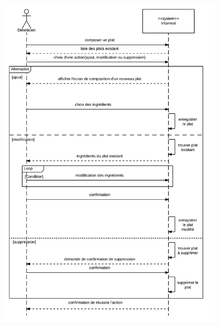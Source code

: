 \documentclass{beamer}
\begin{document}
\begin{frame}[plain]{}
\begin{figure}
\centering
\includegraphics[scale=0.125]{../CasDUtilisations/CompositionPlat/sequence_UC_ComposerPlat.png}
\end{figure}
\end{frame}
\end{document}
